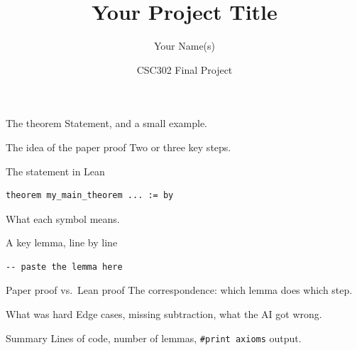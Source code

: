 \documentclass[aspectratio=169,11pt]{beamer}
\title{Your Project Title}
\author{Your Name(s)}
\date{CSC302 Final Project}
\begin{document}
\begin{frame}
  \titlepage
\end{frame}

\begin{frame}{The theorem}
  Statement, and a small example.
\end{frame}

\begin{frame}{The idea of the paper proof}
  Two or three key steps.
\end{frame}

\begin{frame}[fragile]{The statement in Lean}
\begin{lstlisting}
theorem my_main_theorem ... := by
\end{lstlisting}
  What each symbol means.
\end{frame}

\begin{frame}[fragile]{A key lemma, line by line}
\begin{lstlisting}
-- paste the lemma here
\end{lstlisting}
\end{frame}

\begin{frame}{Paper proof vs.\ Lean proof}
  The correspondence: which lemma does which step.
\end{frame}

\begin{frame}{What was hard}
  Edge cases, missing subtraction, what the AI got wrong.
\end{frame}

\begin{frame}{Summary}
  Lines of code, number of lemmas, \texttt{\#print axioms} output.
\end{frame}
\end{document}
